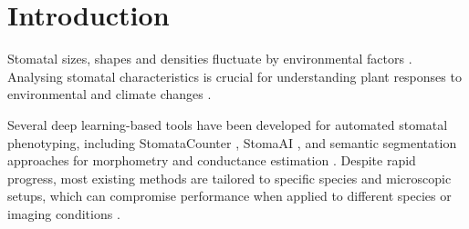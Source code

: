 \documentclass[a4paper,12pt,bibliography=totoc,numbers=noenddot,sfdefaults=false,abstract=true,notitlepage]{scrartcl} %
\begin{document}
	
	
	\begin{singlespace}
		\maketitle %
		
				
				
		
	\end{singlespace}
	
	
	
	
	\section{Introduction}\label{intro}
	
	Stomatal sizes, shapes and densities fluctuate by environmental factors \autocite{hetheringtonRoleStomataSensing2003, cassonInfluenceEnvironmentalFactors2008, bertolinoImpactStomatalDensity2019}. Analysing stomatal characteristics is crucial for understanding plant responses to environmental and climate changes \autocite{hetheringtonRoleStomataSensing2003, yanContrastingResponsesLeaf2017, liangStomatalResponsesTerrestrial2023}.
	
	Several deep learning-based tools have been developed for automated stomatal phenotyping, including StomataCounter \autocite{fetterStomataCounterNeuralNetwork2019}, StomaAI \autocite{saiStomaAIEfficientUserfriendly2023}, and semantic segmentation approaches for morphometry and conductance estimation \autocite{gibbsDeepLearningMethod2021}. Despite rapid progress, most existing methods are tailored to specific species and microscopic setups, which can compromise performance when applied to different species or imaging conditions \autocite{gibbsApplicationDeepLearning2024}.
	
\end{document}
